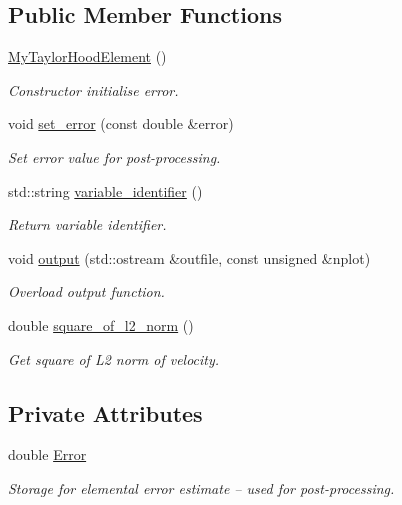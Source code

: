 \subsection*{Public Member Functions}
\begin{DoxyCompactItemize}
\item 
\hyperlink{classoomph_1_1MyTaylorHoodElement_a936bd6421ba42e5b73f983f5141b37c2}{My\+Taylor\+Hood\+Element} ()
\begin{DoxyCompactList}\small\item\em Constructor initialise error. \end{DoxyCompactList}\item 
void \hyperlink{classoomph_1_1MyTaylorHoodElement_ae4f6eea59b7bcf6e737d829b37c47fe9}{set\+\_\+error} (const double \&error)
\begin{DoxyCompactList}\small\item\em Set error value for post-\/processing. \end{DoxyCompactList}\item 
std\+::string \hyperlink{classoomph_1_1MyTaylorHoodElement_a429987090e76cd39a657b3a8eefbbbe9}{variable\+\_\+identifier} ()
\begin{DoxyCompactList}\small\item\em Return variable identifier. \end{DoxyCompactList}\item 
void \hyperlink{classoomph_1_1MyTaylorHoodElement_a5505717f2d16c2b231e7c347cb0c49b1}{output} (std\+::ostream \&outfile, const unsigned \&nplot)
\begin{DoxyCompactList}\small\item\em Overload output function. \end{DoxyCompactList}\item 
double \hyperlink{classoomph_1_1MyTaylorHoodElement_ad9efcab0ef22434e6fc5f2eb4b84643d}{square\+\_\+of\+\_\+l2\+\_\+norm} ()
\begin{DoxyCompactList}\small\item\em Get square of L2 norm of velocity. \end{DoxyCompactList}\end{DoxyCompactItemize}
\subsection*{Private Attributes}
\begin{DoxyCompactItemize}
\item 
double \hyperlink{classoomph_1_1MyTaylorHoodElement_a381cf2cdb628fb7aacfd6dd59dc2996b}{Error}
\begin{DoxyCompactList}\small\item\em Storage for elemental error estimate -- used for post-\/processing. \end{DoxyCompactList}\end{DoxyCompactItemize}


